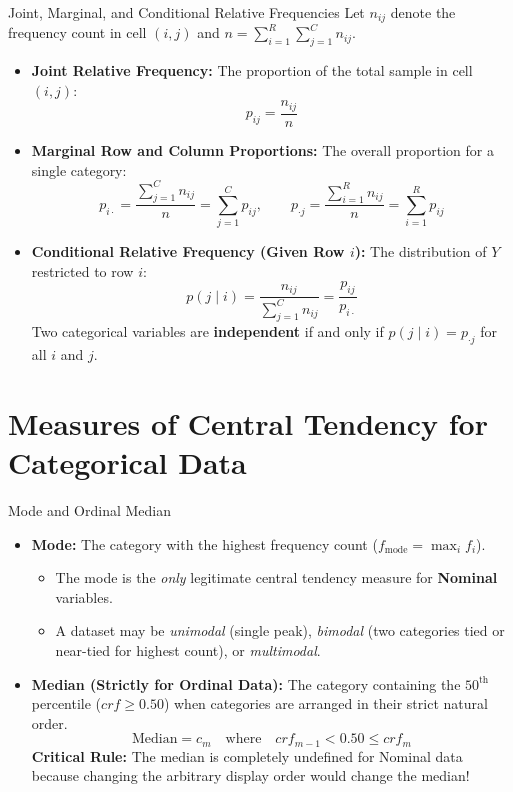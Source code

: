 \begin{definitionbox}{Joint, Marginal, and Conditional Relative Frequencies}
Let $n_{ij}$ denote the frequency count in cell $(i, j)$ and $n = \sum_{i=1}^R \sum_{j=1}^C n_{ij}$.
\begin{itemize}
    \item \textbf{Joint Relative Frequency:} The proportion of the total sample in cell $(i, j)$:
    $$p_{ij} = \frac{n_{ij}}{n}$$
    \item \textbf{Marginal Row and Column Proportions:} The overall proportion for a single category:
    $$p_{i\cdot} = \frac{\sum_{j=1}^C n_{ij}}{n} = \sum_{j=1}^C p_{ij}, \qquad p_{\cdot j} = \frac{\sum_{i=1}^R n_{ij}}{n} = \sum_{i=1}^R p_{ij}$$
    \item \textbf{Conditional Relative Frequency (Given Row $i$):} The distribution of $Y$ restricted to row $i$:
    $$p(j \mid i) = \frac{n_{ij}}{\sum_{j=1}^C n_{ij}} = \frac{p_{ij}}{p_{i\cdot}}$$
    Two categorical variables are \textbf{independent} if and only if $p(j \mid i) = p_{\cdot j}$ for all $i$ and $j$.
\end{itemize}
\end{definitionbox}

\section{Measures of Central Tendency for Categorical Data}

\begin{definitionbox}{Mode and Ordinal Median}
\begin{itemize}
    \item \textbf{Mode:} The category with the highest frequency count ($f_{\text{mode}} = \max_i f_i$).
    \begin{itemize}
        \item The mode is the \emph{only} legitimate central tendency measure for \textbf{Nominal} variables.
        \item A dataset may be \emph{unimodal} (single peak), \emph{bimodal} (two categories tied or near-tied for highest count), or \emph{multimodal}.
    \end{itemize}
    \item \textbf{Median (Strictly for Ordinal Data):} The category containing the $50^{\text{th}}$ percentile ($crf \ge 0.50$) when categories are arranged in their strict natural order.
    $$\text{Median} = c_m \quad \text{where} \quad crf_{m-1} < 0.50 \le crf_m$$
    \textbf{Critical Rule:} The median is completely undefined for Nominal data because changing the arbitrary display order would change the median!
\end{itemize}
\end{definitionbox}

